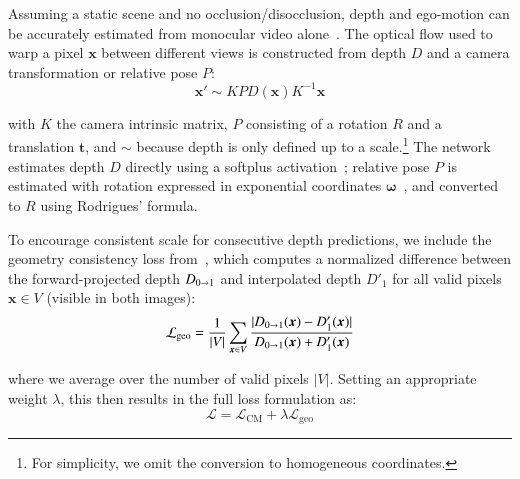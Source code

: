 Assuming a static scene and no occlusion/disocclusion, depth and ego-motion can be accurately estimated from monocular video alone~\cite{zhou2017unsupervised}. The optical flow used to warp a pixel $\boldsymbol{x}$ between different views is constructed from depth $D$ and a camera transformation or relative pose $P$:
\begin{equation}
    \boldsymbol{x}' \sim KPD(\boldsymbol{x})K^{-1}\boldsymbol{x}
\end{equation}

with $K$ the camera intrinsic matrix, $P$ consisting of a rotation $R$ and a translation $\boldsymbol{t}$, and $\sim$ because depth is only defined up to a scale.\footnote{For simplicity, we omit the conversion to homogeneous coordinates.} The network estimates depth $D$ directly using a softplus activation~\cite{gordon2019depth}; relative pose $P$ is estimated with rotation expressed in exponential coordinates $\boldsymbol{\omega}$~\cite{wang2018learning}, and converted to $R$ using Rodrigues' formula.

To encourage consistent scale for consecutive depth predictions, we include the geometry consistency loss from~\cite{bian2019unsupervised}, which computes a normalized difference between the forward-projected depth $D_{0\shortrightarrow1}$ and interpolated depth $D'_1$ for all valid pixels $\boldsymbol{x}\in V$ (visible in both images):
\begin{equation}
    \mathcal{L}_\text{geo} = \frac{1}{\lvert V \rvert} \sum_{\boldsymbol{x}\in V} \frac{\lvert D_{0\shortrightarrow1}(\boldsymbol{x}) - D'_1(\boldsymbol{x}) \rvert}{D_{0\shortrightarrow1}(\boldsymbol{x}) + D'_1(\boldsymbol{x})}
\end{equation}

where we average over the number of valid pixels $\lvert V \rvert$. Setting an appropriate weight $\lambda$, this then results in the full loss formulation as:
\begin{equation}
    \mathcal{L} = \mathcal{L}_\text{CM} + \lambda\mathcal{L}_\text{geo}
\end{equation}

